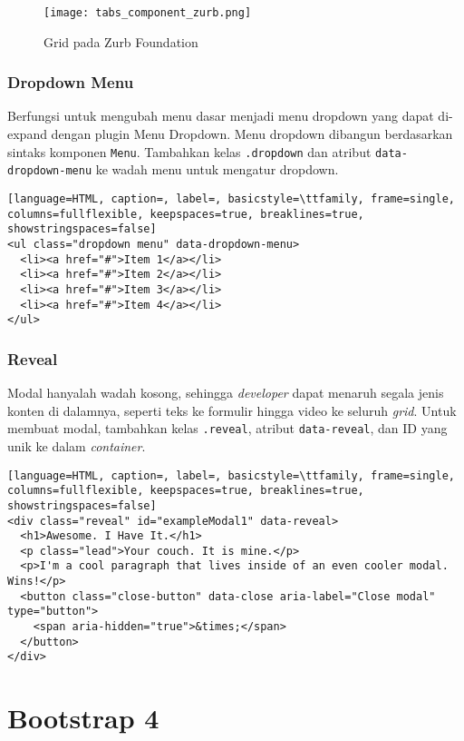 \begin{figure} [H]
	\centering  
	\texttt{[image: tabs\_component\_zurb.png]}  
	\caption{Grid pada Zurb Foundation}
\end{figure}

\subsubsection{Dropdown Menu}
Berfungsi untuk mengubah menu dasar menjadi menu dropdown yang dapat di-expand dengan plugin Menu Dropdown.
Menu dropdown dibangun berdasarkan sintaks komponen \texttt{Menu}. Tambahkan kelas \texttt{.dropdown} dan atribut \texttt{data-dropdown-menu} ke wadah menu untuk mengatur dropdown. 
\begin{lstlisting}[language=HTML, caption=, label=, basicstyle=\ttfamily, frame=single, columns=fullflexible, keepspaces=true, breaklines=true, showstringspaces=false] 
<ul class="dropdown menu" data-dropdown-menu>
  <li><a href="#">Item 1</a></li>
  <li><a href="#">Item 2</a></li>
  <li><a href="#">Item 3</a></li>
  <li><a href="#">Item 4</a></li>
</ul>
\end{lstlisting}

\subsubsection{Reveal}
Modal hanyalah wadah kosong, sehingga \textit{developer} dapat menaruh segala jenis konten di dalamnya, seperti teks ke formulir hingga video ke seluruh \textit{grid}.
Untuk membuat modal, tambahkan kelas \texttt{.reveal}, atribut \texttt{data-reveal}, dan ID yang unik ke dalam \textit{container}.

\begin{lstlisting}[language=HTML, caption=, label=, basicstyle=\ttfamily, frame=single, columns=fullflexible, keepspaces=true, breaklines=true, showstringspaces=false]  
<div class="reveal" id="exampleModal1" data-reveal>
  <h1>Awesome. I Have It.</h1>
  <p class="lead">Your couch. It is mine.</p>
  <p>I'm a cool paragraph that lives inside of an even cooler modal. Wins!</p>
  <button class="close-button" data-close aria-label="Close modal" type="button">
    <span aria-hidden="true">&times;</span>
  </button>
</div>
\end{lstlisting} 

\section{Bootstrap 4}
